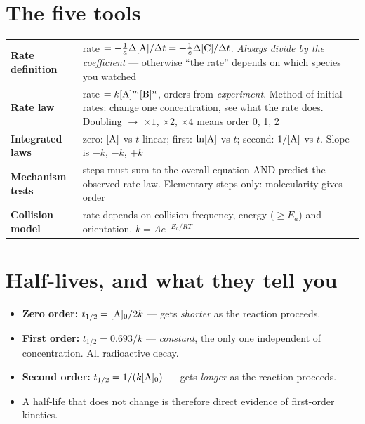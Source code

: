 \documentclass{apchem-worksheet}
\begin{document}
\apctitleblock

\section*{\sffamily The five tools}

\renewcommand{\arraystretch}{1.45}
\noindent\begin{tabular}{@{}p{3.9cm}p{9.8cm}@{}}
\toprule
\textbf{Rate definition} & rate $= -\tfrac{1}{a}\Delta[\ce{A}]/\Delta t =
  +\tfrac{1}{c}\Delta[\ce{C}]/\Delta t$. \emph{Always divide by the
  coefficient} --- otherwise ``the rate'' depends on which species you
  watched\\
\textbf{Rate law} & rate $= k[\ce{A}]^m[\ce{B}]^n$, orders from
  \emph{experiment}. Method of initial rates: change one concentration,
  see what the rate does. Doubling $\to$ $\times1$, $\times2$, $\times4$
  means order 0, 1, 2\\
\textbf{Integrated laws} & zero: $[\ce{A}]$ vs $t$ linear; first:
  $\ln[\ce{A}]$ vs $t$; second: $1/[\ce{A}]$ vs $t$. Slope is $-k$, $-k$,
  $+k$\\
\textbf{Mechanism tests} & steps must sum to the overall equation AND
  predict the observed rate law. Elementary steps only: molecularity gives
  order\\
\textbf{Collision model} & rate depends on collision frequency, energy
  ($\ge E_a$) and orientation. $k = Ae^{-E_a/RT}$\\
\bottomrule
\end{tabular}

\section*{\sffamily Half-lives, and what they tell you}

\begin{itemize}[leftmargin=*,itemsep=0.18em]
  \item \textbf{Zero order:} $t_{1/2} = [\ce{A}]_0/2k$ --- gets
        \emph{shorter} as the reaction proceeds.
  \item \textbf{First order:} $t_{1/2} = 0.693/k$ --- \emph{constant}, the
        only one independent of concentration. All radioactive decay.
  \item \textbf{Second order:} $t_{1/2} = 1/(k[\ce{A}]_0)$ --- gets
        \emph{longer} as the reaction proceeds.
  \item A half-life that does not change is therefore direct evidence of
        first-order kinetics.
\end{itemize}
\end{document}
